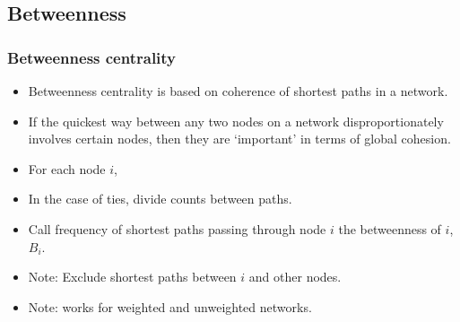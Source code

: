 \subsection{Betweenness}

\begin{frame}
  \frametitle{Betweenness centrality}

  \begin{itemize}
  \item<1-> \alert{Betweenness centrality} 
    is based 
    on coherence of shortest paths in a network.
  \item<2-> 
    If the quickest way between any two
    nodes on a network disproportionately 
    involves certain nodes, then they are
    `important' in terms of global cohesion.
  \item<3->
    For each node $i$, 
  \item<4-> 
    In the case of ties, 
    divide
    counts between paths.
  \item<5-> 
    Call frequency of shortest paths passing
    through node $i$ the betweenness of $i$, $B_i$.
  \item<6-> 
    Note: Exclude shortest paths between $i$ and other nodes.
  \item<7-> 
    Note: works for weighted and unweighted networks.
  \end{itemize}

\end{frame}

